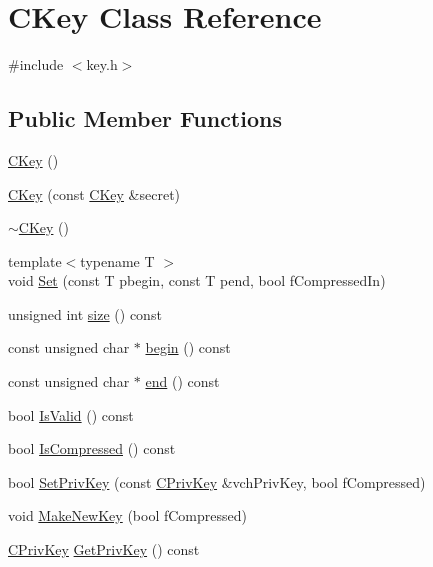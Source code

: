 \hypertarget{class_c_key}{}\section{C\+Key Class Reference}
\label{class_c_key}


{\ttfamily \#include $<$key.\+h$>$}

\subsection*{Public Member Functions}
\begin{DoxyCompactItemize}
\item 
\hyperlink{class_c_key_a8f4ca910c7b7e729a3f2a5c59d060d3d}{C\+Key} ()
\item 
\hyperlink{class_c_key_afcea34cefd25675f4cf9b03eaa4bb7d9}{C\+Key} (const \hyperlink{class_c_key}{C\+Key} \&secret)
\item 
\hyperlink{class_c_key_a57d5b254748cef054c40f99c1c339147}{$\sim$\+C\+Key} ()
\item 
{\footnotesize template$<$typename T $>$ }\\void \hyperlink{class_c_key_aaa13d5f08456bba094210c5eeabf64c8}{Set} (const T pbegin, const T pend, bool f\+Compressed\+In)
\item 
unsigned int \hyperlink{class_c_key_a6329a38926a8af8112d06da96afbfe39}{size} () const 
\item 
const unsigned char $\ast$ \hyperlink{class_c_key_aabd29e0d5faf30032cc8519a1ce62a5a}{begin} () const 
\item 
const unsigned char $\ast$ \hyperlink{class_c_key_a651d1e10b4085da5e4c4a764f3a384df}{end} () const 
\item 
bool \hyperlink{class_c_key_a62094263b7422a45b45ac508396f19eb}{Is\+Valid} () const 
\item 
bool \hyperlink{class_c_key_abdc7d807f7a1b27ff3ad9dd5164a2273}{Is\+Compressed} () const 
\item 
bool \hyperlink{class_c_key_aa62c082c9037565fce02b457cc335e7b}{Set\+Priv\+Key} (const \hyperlink{key_8h_a1da569b8b6e5b3fa1196cc1b877e7f54}{C\+Priv\+Key} \&vch\+Priv\+Key, bool f\+Compressed)
\item 
void \hyperlink{class_c_key_a9d12ed9d297e4286250fd7ea6b59e1a5}{Make\+New\+Key} (bool f\+Compressed)
\item 
\hyperlink{key_8h_a1da569b8b6e5b3fa1196cc1b877e7f54}{C\+Priv\+Key} \hyperlink{class_c_key_ab38813e7091f658612dfb14f17c9e317}{Get\+Priv\+Key} () const 
\item 

\end{DoxyCompactItemize}
